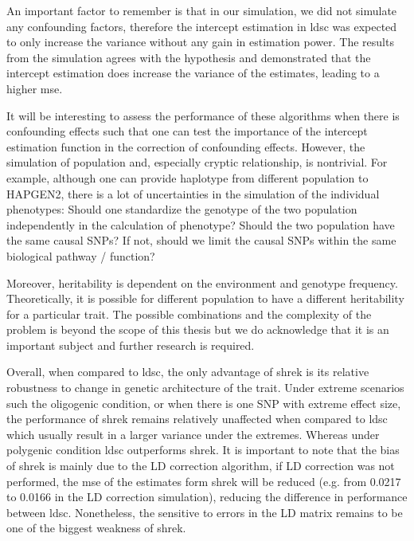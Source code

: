 	An important factor to remember is that in our simulation, we did not simulate any confounding factors, therefore the intercept estimation in \gls{ldsc} was expected to only increase the variance without any gain in estimation power. 
	The results from the simulation agrees with the hypothesis and demonstrated that the intercept estimation does increase the variance of the estimates, leading to a higher \gls{mse}. 
	
	It will be interesting to assess the performance of these algorithms when there is confounding effects such that one can test the importance of the intercept estimation function in the correction of confounding effects.
	However, the simulation of population and, especially cryptic relationship, is nontrivial.
	For example, although one can provide haplotype from different population to HAPGEN2, there is a lot of uncertainties in the simulation of the individual phenotypes: 
	Should one standardize the genotype of the two population independently in the calculation of phenotype? 
	Should the two population have the same causal \glspl{SNP}?
	If not, should we limit the causal \glspl{SNP} within the same biological pathway / function?
	
	Moreover, heritability is dependent on the environment and genotype frequency. 
	Theoretically, it is possible for different population to have a different heritability for a particular trait.
	The possible combinations and the complexity of the problem is beyond the scope of this thesis but we do acknowledge that it is an important subject and further research is required.
	
	Overall, when compared to \gls{ldsc}, the only advantage of \gls{shrek} is its relative robustness to change in genetic architecture of the trait.
	Under extreme scenarios such the oligogenic condition, or when there is one \gls{SNP} with extreme effect size, the performance of \gls{shrek} remains relatively unaffected when compared to \gls{ldsc} which usually result in a larger variance under the extremes. 
	Whereas under polygenic condition \gls{ldsc} outperforms \gls{shrek}.
	It is important to note that the bias of \gls{shrek} is mainly due to the \gls{LD} correction algorithm, if \gls{LD} correction was not performed, the \gls{mse} of the estimates form \gls{shrek} will be reduced (e.g. from 0.0217 to 0.0166 in the \gls{LD} correction simulation), reducing the difference in performance between \gls{ldsc}.
	Nonetheless, the sensitive to errors in the \gls{LD} matrix remains to be one of the biggest weakness of \gls{shrek}.
	
